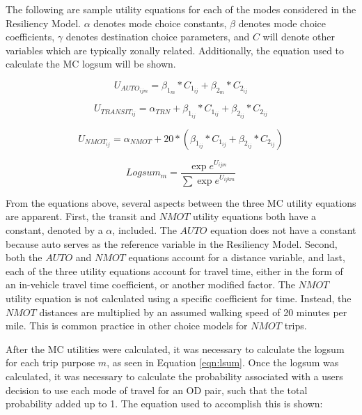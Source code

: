 The following are sample utility equations for each of the modes considered in
the Resiliency Model. $\alpha$ denotes mode choice constants, $\beta$ denotes
mode choice coefficients, $\gamma$ denotes destination choice parameters, and
$C$ will denote other variables which are typically zonally related. Additionally,
the equation used to calculate the MC logsum will be shown.


\begin{equation}
U_{{AUTO}_{ijm}} = \beta_{1_{m}} * C_{1_{ij}} + \beta_{2_{m}} * C_{2_{ij}}
	\label{eqn:auto}
\end{equation}

\begin{equation}
U_{{TRANSIT}_{ij}} = \alpha_{TRN} + \beta_{1_{ij}} * C_{1_{ij}} + \beta_{2_{ij}} * C_{2_{ij}}
	\label{eqn:transit}
\end{equation}

\begin{equation}
U_{{NMOT}_{ij}} = \alpha_{NMOT} + 20 * (\beta_{1_{ij}} * C_{1_{ij}} + \beta_{2_{ij}} * C_{2_{ij}})
	\label{eqn:nmot}
\end{equation}

\begin{equation}
  Logsum_{m} = \frac{\exp e^{U_{ijm}}}{\sum \exp e^{U_{ijkm}}}
  \label{eqn:lsum}
\end{equation}

From the equations above, several aspects between the three MC utility equations are
apparent. First, the transit and $NMOT$ utility equations both have a constant, denoted by a $\alpha$,
included. The $AUTO$ equation does not have a constant because auto serves as the reference
variable in the Resiliency Model. Second, both the $AUTO$ and $NMOT$ equations account for a
distance variable, and last, each of the three utility equations account for travel time, either in the
form of an in-vehicle travel time coefficient, or another modified factor. The $NMOT$ utility
equation is not calculated using a specific coefficient for time. Instead, the $NMOT$ distances are
multiplied by an assumed walking speed of 20 minutes per mile. This is common practice in other
choice models for $NMOT$ trips.

After the MC utilities were calculated, it was necessary to calculate the logsum for
each trip purpose \(m\), as seen in Equation \ref{eqn:lsum}. Once the logsum was calculated,
it was necessary to calculate the probability associated with a users decision to use
each mode of travel for an OD pair, such that the total probability added
up to 1. The equation used to accomplish this is shown:

